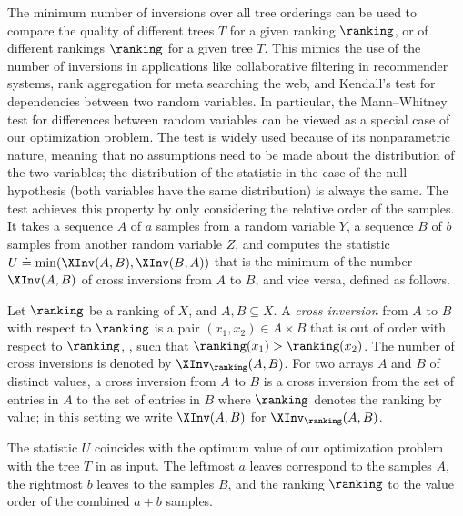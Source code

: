The minimum number of inversions over all tree orderings %
%
can be used to compare the quality of different trees $T$ for a given ranking $\ranking$, or of different rankings $\ranking$ for a given tree $T$. This mimics the use of the number of inversions in applications like collaborative filtering in recommender systems, rank aggregation for meta searching the web, and Kendall's test for dependencies between two random variables. 
In particular, the Mann--Whitney test for differences between random variables can be viewed as a special case of our optimization problem. The test is widely used because of its nonparametric nature, meaning that no assumptions need to be made about the distribution of the two variables; the distribution of the statistic in the case of the null hypothesis (both variables have the same distribution) is always the same. The test achieves this property by only considering the relative order of the samples. It takes a sequence $A$ of $a$ samples from a random variable $Y$, a sequence $B$ of $b$ samples from another random variable $Z$, and computes the statistic $U \doteq \min(\XInv(A,B),\XInv(B,A))$ that is the minimum of the number $\XInv(A,B)$ of cross inversions from $A$ to $B$, and vice versa, defined as follows.  %
%
\begin{definition}
Let $\ranking$ be a ranking of $X$, and $A, B \subseteq X$. A \emph{cross inversion} from $A$ to $B$ with respect to $\ranking$ is a pair $(x_1,x_2) \in A \times B$ that is out of order with respect to $\ranking$, \ie, such that $\ranking(x_1) > \ranking(x_2)$. The number of cross inversions is denoted by $\XInv_\ranking(A,B)$.
For two arrays $A$ and $B$ of
%
%
distinct values, a cross inversion from $A$ to $B$ is a cross inversion from the set of entries in $A$ to the set of entries in $B$ where $\ranking$ denotes the ranking by value; in this setting we write $\XInv(A,B)$ for $\XInv_\ranking(A,B)$.
\end{definition}
The statistic $U$ coincides with the optimum value of our optimization problem with the tree $T$ in  as input. The leftmost $a$ leaves correspond to the samples $A$, the rightmost $b$ leaves to the samples $B$, and the ranking $\ranking$ to the value order of the combined $a+b$ samples.
